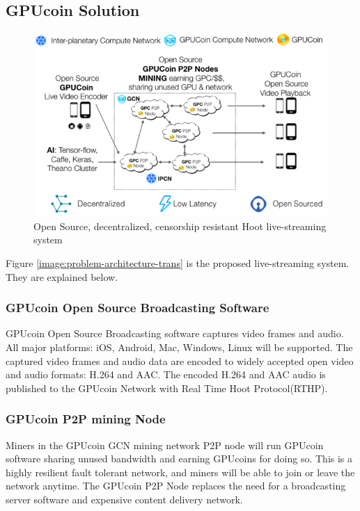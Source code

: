 \documentclass{article}
\begin{document}
\subsection{GPUcoin Solution}

\begin{figure}[h!]
 \centering
 \includegraphics[width=1.0\textwidth]{static/gpucoin-solution-trans-ai}
 \caption{Open Source, decentralized, censorship resistant Hoot live-streaming system}
 \label{image:gpucoin-solution-trans-ai}
\end{figure}


Figure \ref{image:problem-architecture-trans} is the proposed live-streaming system. They are explained below.
\subsubsection{GPUcoin Open Source Broadcasting Software}
GPUcoin Open Source Broadcasting software captures video frames and audio. All major platforms: iOS, Android, Mac, Windows, Linux will be supported. The captured video frames and audio data are encoded to widely accepted open video and audio formats: H.264 and AAC. The encoded H.264 and AAC audio is published to the GPUcoin Network with Real Time Hoot Protocol(RTHP).

\subsubsection{GPUcoin P2P mining Node}
Miners in the GPUcoin GCN mining network P2P node will run GPUcoin software sharing unused bandwidth and earning GPUcoins for doing so. This is a highly resilient fault tolerant network, and miners will be able to join or leave the network anytime. The GPUcoin P2P Node replaces the need for a broadcasting server software and expensive content delivery network.
\end{document}
